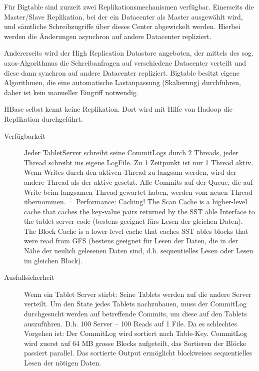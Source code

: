 \documentclass[a4paper,10pt,titlepage=false]{scrreprt}
\begin{document}
\begin{enumerate}
Für Bigtable sind zurzeit zwei Replikationsmechanismen verfügbar. Einerseits die Master/Slave Replikation, bei der ein Datacenter als Master ausgewählt wird, und sämtliche Schreibzugriffe über dieses Center abgewickelt werden. Hierbei werden die Änderungen asynchron auf andere Datacenter repliziert. 

Andererseits wird der High Replication Datastore angeboten, der mittels des sog. axos-Algorithmus die Schreibanfragen auf verschiedene Datacenter verteilt und diese dann synchron auf andere Datacenter repliziert. Bigtable besitzt eigene Algorithmen, die eine automatische Lastanpassung (Skalierung) durchführen, daher ist kein manueller Eingriff notwendig.

HBase selbst kennt keine Replikation. Dort wird mit Hilfe von Hadoop die Replikation durchgeführt. 
\begin{description}
  \item[Verfügbarkeit]    Jeder TabletServer schreibt seine CommitLogs durch 2 Threads, jeder Thread schreibt ins eigene LogFile. Zu 1 Zeitpunkt ist nur 1 Thread aktiv. Wenn Writes durch den aktiven Thread zu langsam werden, wird der andere Thread als der aktive gesetzt. Alle Commits auf der Queue, die auf Write beim langsamen Thread gewartet haben, werden vom neuen Thread übernommen.
·         Performance: Caching! The Scan Cache is a higher-level cache that caches the key-value pairs returned by the SST able Interface to the tablet server code (bestens geeignet fürs Lesen der gleichen Daten). The Block Cache is a lower-level cache that caches SST ables blocks that were read from GFS (bestens geeignet für Lesen der Daten, die in der Nähe der neulich gelesenen Daten sind, d.h. sequentielles Lesen oder Lesen im gleichen Block).
\item[Ausfallsicherheit] Wenn ein Tablet Server stirbt: Seine Tablets werden auf die andere Server verteilt. Um den State jedes Tablets nachzubauen, muss der CommitLog durchgesucht werden auf betreffende Commits, um diese auf den Tablets auszuführen. D.h. 100 Server – 100 Reads auf 1 File. Da es schlechtes Vorgehen ist: Der CommitLog wird sortiert nach Table-Key. CommitLog wird zuerst auf 64 MB grosse Blocks aufgeteilt, das Sortieren der Blöcke passiert parallel. Das sortierte Output ermöglicht blockweises sequentielles Lesen der nötigen Daten.
\end{description}
\end{enumerate}
\end{document}
